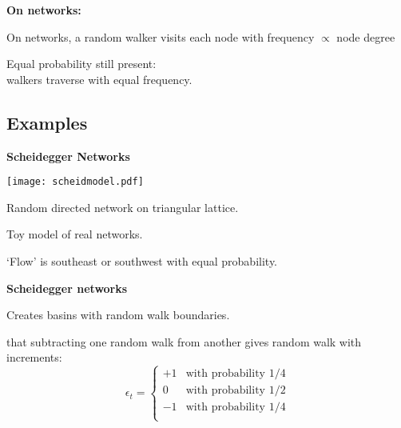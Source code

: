   

  \textbf{On networks:}
    
    
      On networks, a random walker visits each node
      with frequency $\propto$ node degree
      \hfill {}
    
      Equal probability still present:\\
      walkers traverse
       with equal frequency. \\
      \mbox{} \hfill {}
    
  





%   
%
% 



\subsection{Examples}

  \textbf{Scheidegger Networks\cite{scheidegger1967b,dodds2000a}}

  
    \texttt{[image: scheidmodel.pdf]}
    
     
      Random directed network on triangular lattice.
     
      Toy model of real networks.
     
      `Flow' is southeast or southwest with equal probability.
    
  



  \textbf{Scheidegger networks}

  
  
   
    Creates basins with random walk boundaries.
   
     that subtracting one random walk from another
    gives random walk with increments:
    $$
    \epsilon_t = 
    \left\{
      \begin{array}{cl}
        +1 & \mbox{with probability $1/4$} \\
        0 & \mbox{with probability $1/2$} \\
        -1 & \mbox{with probability $1/4$} \\
      \end{array}
    \right.
    $$
   

